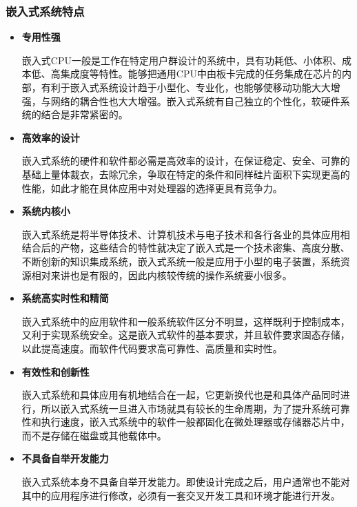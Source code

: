 \documentclass[12pt, a4paper]{article}
\begin{document}
		\subsubsection{嵌入式系统特点}
	\begin{itemize}
		\item  \textbf{专用性强}
		
		嵌入式CPU一般是工作在特定用户群设计的系统中，具有功耗低、小体积、成本低、高集成度等特性。能够把通用CPU中由板卡完成的任务集成在芯片的内部，有利于嵌入式系统设计趋于小型化、专业化，也能够使移动功能大大增强，与网络的耦合性也大大增强。嵌入式系统有自己独立的个性化，软硬件系统的结合是非常紧密的。
		
		\item \textbf{高效率的设计}
		
		嵌入式系统的硬件和软件都必需是高效率的设计，在保证稳定、安全、可靠的基础上量体裁衣，去除冗余，争取在特定的条件和同样硅片面积下实现更高的性能，如此才能在具体应用中对处理器的选择更具有竞争力。
		
		\item \textbf{系统内核小}
		
		嵌入式系统是将半导体技术、计算机技术与电子技术和各行各业的具体应用相结合后的产物，这些结合的特性就决定了嵌入式是一个技术密集、高度分散、不断创新的知识集成系统，嵌入式系统一般是应用于小型的电子装置，系统资源相对来讲也是有限的，因此内核较传统的操作系统要小很多。
		
		\item \textbf{系统高实时性和精简}
		
		嵌入式系统中的应用软件和一般系统软件区分不明显，这样既利于控制成本，又利于实现系统安全。这是嵌入式软件的基本要求，并且软件要求固态存储，以此提高速度。而软件代码要求高可靠性、高质量和实时性。
		
		\item \textbf{有效性和创新性}
		
		嵌入式系统和具体应用有机地结合在一起，它更新换代也是和具体产品同时进行，所以嵌入式系统一旦进入市场就具有较长的生命周期，为了提升系统可靠性和执行速度，嵌入式系统中的软件一般都固化在微处理器或存储器芯片中，而不是存储在磁盘或其他载体中。
		
		\item \textbf{不具备自举开发能力}  
		
		嵌入式系统本身不具备自举开发能力。即使设计完成之后，用户通常也不能对其中的应用程序进行修改，必须有一套交叉开发工具和环境才能进行开发。
	\end{itemize}
	
\end{document}
